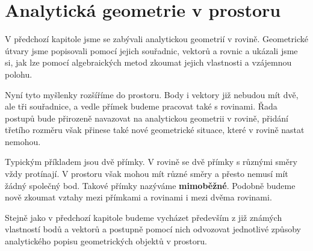 \section{Analytická geometrie v prostoru}
\label{sec:Analytic_geometry_space}

V předchozí kapitole jsme se zabývali analytickou geometrií v rovině.
Geometrické útvary jsme popisovali pomocí jejich souřadnic, vektorů
a rovnic a ukázali jsme si, jak lze pomocí algebraických metod zkoumat
jejich vlastnosti a vzájemnou polohu.

Nyní tyto myšlenky rozšíříme do prostoru. Body i vektory již nebudou
mít dvě, ale tři souřadnice, a vedle přímek budeme pracovat také
s rovinami. Řada postupů bude přirozeně navazovat na analytickou
geometrii v rovině, přidání třetího rozměru však přinese také nové
geometrické situace, které v rovině nastat nemohou.

Typickým příkladem jsou dvě přímky. V rovině se dvě přímky s různými
směry vždy protínají. V prostoru však mohou mít různé směry a přesto
nemusí mít žádný společný bod. Takové přímky nazýváme
\textbf{mimoběžné}. Podobně budeme nově zkoumat vztahy mezi přímkami
a rovinami i mezi dvěma rovinami.

Stejně jako v předchozí kapitole budeme vycházet především z již
známých vlastností bodů a vektorů a postupně pomocí nich odvozovat
jednotlivé způsoby analytického popisu geometrických objektů
v prostoru.












